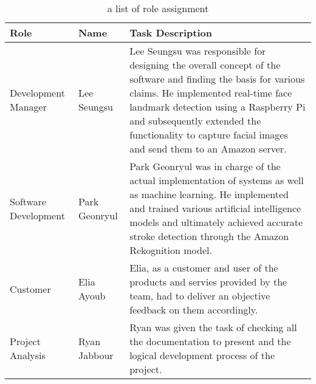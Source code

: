 \documentclass[conference]{IEEEtran}
\begin{document}
\begin{abstract}
\end{abstract}


\begin{table}[h]
    \caption{a list of role assignment}
    \begin{tabular}{|p{2.6cm}|p{1.7cm}|p{3.4cm}|}
    \hline
    Role & Name & Task Description \\ \hline
      Development Manager & Lee Seungsu & Lee Seungsu was responsible for designing the overall concept of the software and finding the basis for various claims. He implemented real-time face landmark detection using a Raspberry Pi and subsequently extended the functionality to capture facial images and send them to an Amazon server.\\ \hline
      Software Development & Park Geonryul & Park Geonryul was in charge of the actual implementation of systems as well as machine learning. He implemented and trained various artificial intelligence models and ultimately achieved accurate stroke detection through the Amazon Rekognition model.\\ \hline
      Customer & Elia Ayoub & Elia, as a customer and user of the products and servies provided by the team, had to deliver an objective feedback on them accordingly.\\ \hline
      Project Analysis & Ryan Jabbour & Ryan was given the task of checking all the documentation to present and the logical development process of the project.\\ \hline
    \end{tabular}
    \end{table}









%


\end{document}
